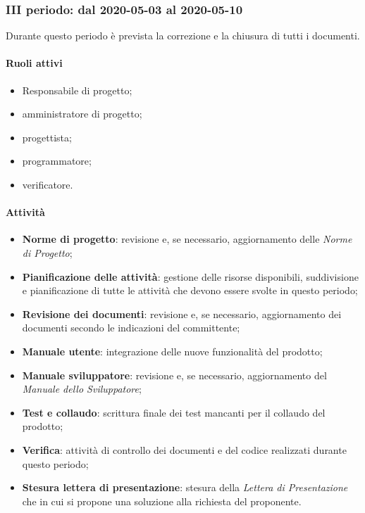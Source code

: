 \subsubsection{III periodo: dal 2020-05-03 al 2020-05-10}
Durante questo periodo è prevista la correzione e la chiusura di tutti i documenti.
\paragraph{Ruoli attivi}
\begin{itemize}
	\item Responsabile di progetto\glo;
	\item amministratore di progetto\glo;
	\item progettista;
	\item programmatore;
	\item verificatore.
\end{itemize}
\paragraph{Attività}
\begin{itemize}
	\item \textbf{Norme di progetto}: revisione e, se necessario, aggiornamento delle \textit{Norme di Progetto};
	\item \textbf{Pianificazione delle attività}: gestione delle risorse disponibili, suddivisione e pianificazione di tutte le attività che devono essere svolte in questo periodo;
	\item \textbf{Revisione dei documenti}: revisione e, se necessario, aggiornamento dei documenti secondo le indicazioni del committente;
	\item \textbf{Manuale utente}: integrazione delle nuove funzionalità del prodotto\glo;
	\item \textbf{Manuale sviluppatore}:  revisione e, se necessario, aggiornamento del \textit{Manuale dello Sviluppatore};
	\item \textbf{Test e collaudo}: scrittura finale dei test mancanti per il collaudo del prodotto\glo;
	\item \textbf{Verifica}: attività di controllo dei documenti e del codice realizzati durante questo periodo;
	\item \textbf{Stesura lettera di presentazione}: stesura della \textit{Lettera di Presentazione} che in cui si propone una soluzione alla richiesta del proponente.
\end{itemize}

